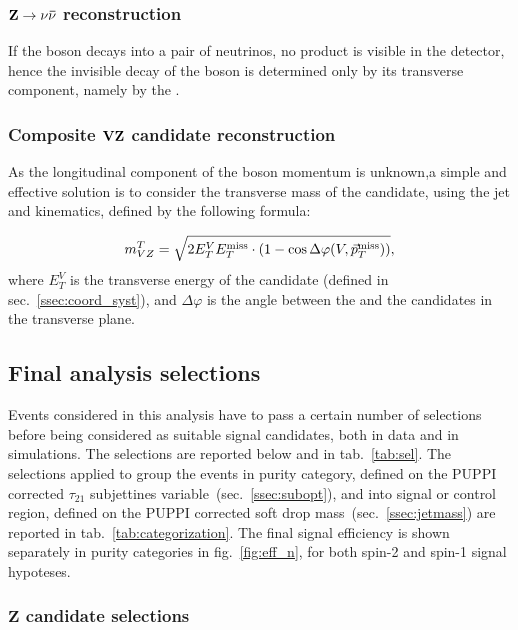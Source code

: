 \subsubsection{$\mathbf{Z \rightarrow \nu \bar{\nu} }$ reconstruction}
\label{ssec:Zcand}

If the \Z boson decays into a pair of neutrinos, no product is visible in the detector, hence the invisible decay of the \Z boson is determined only by its transverse component, namely by the \MET.

\subsubsection{Composite $\mathbf{VZ}$ candidate reconstruction}
\label{ssec:VZcand}

As the longitudinal component of the \Z boson momentum is unknown,a simple and effective solution is to consider the transverse mass of the \VZ candidate, using the jet and \met kinematics, defined by the following formula:

\begin{equation}
m_{VZ}^T = \sqrt{ 2 E_T^V E_T^{\text{miss}} \cdot (1 - \cos \Delta \varphi(V,\vec{p}_T^{\text{miss}})) },
\end{equation}
where $E_T^{V}$ is the transverse energy of the \V candidate (defined in sec.~\ref{ssec:coord_syst}), and $\Delta \varphi$ is the angle between the \V and the \Z candidates in the transverse plane.

\subsection{Final analysis selections}
\label{sec:selections}

Events considered in this analysis have to pass a certain number of selections before being considered as suitable signal candidates, both in data and in simulations. The selections are reported below and in tab.~\ref{tab:sel}. The selections applied to group the events in purity category, defined on the PUPPI corrected $\tau_{21}$ subjettines variable~(sec.~\ref{ssec:subopt}), and into signal or control region, defined on the PUPPI corrected soft drop mass~(sec.~\ref{ssec:jetmass}) are reported in tab.~\ref{tab:categorization}. The final signal efficiency is shown separately in purity categories in fig.~\ref{fig:eff_n}, for both spin-2 and spin-1 signal hypoteses.

\subsubsection{$\mathbf{Z}$ candidate selections}

